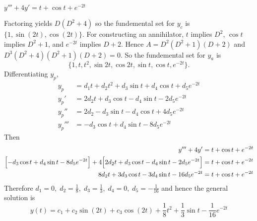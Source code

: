 $y''' + 4y' = t + \cos t + e^{-2t}$

\soln Factoring yields $D(D^2+4)$ so the fundemental set for $y_c$ is $\{1, \sin (2t), \cos(2t)\}$. For constructing an annihilator, $t$ implies $D^2$, $\cos t$ implies $D^2+1$, and $e^{-2t}$ implies $D+2$. Hence $A = D^2(D^2 + 1)(D+2)$ and $D^3(D^2+4)(D^2 + 1)(D+2) = 0$. So the fundemental set for $y_a$ is $$\{ 1, t, t^2, \sin 2t, \cos 2t, \sin t, \cos t, e^{-2t}\}.$$
Differentiating $y_p$,
\begin{align*}
    y_p &= d_1 t + d_2 t^2 + d_3 \sin t + d_4 \cos t + d_5 e^{-2t}\\
    y_p' &= 2 d_2 t + d_3 \cos t - d_4 \sin t - 2 d_5 e^{-2t}\\
    y_p'' &= 2d_2 - d_3 \sin t - d_4 \cos t + 4 d_5 e^{-2t}\\
    y_p''' &= -d_3 \cos t + d_4 \sin t - 8 d_5 e^{-2t}
\end{align*}
Then 
\begin{align*}
    y''' + 4y' &= t + \cos t + e^{-2t}\\
    \Big[ { -d_3 \cos t + d_4 \sin t - 8 d_5 e^{-2t} } \Big] + 4 \Big[ { 2 d_2 t + d_3 \cos t - d_4 \sin t - 2 d_5 e^{-2t} } \Big] &=  t + \cos t + e^{-2t}\\
    8d_2t + 3d_3 \cos t - 3 d_4 \sin t - 16 d_5 e^{-2t}&=  t + \cos t + e^{-2t}
\end{align*}
Therefore $d_1 = 0, \; d_2 = \frac18, \; d_3 = \frac13, \; d_4 = 0, \; d_5 = -\frac{1}{16}$ and hence the general solution is 
$$y(t) = c_1 + c_2 \sin (2t) + c_3 \cos (2t) + \frac18 t^2 + \frac13 \sin t - \frac{1}{16} e^{-2t}$$